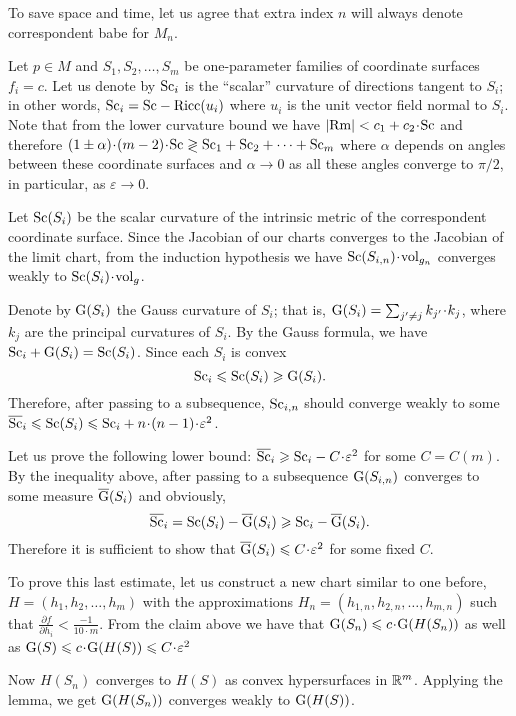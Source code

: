 \documentclass{article}
\begin{document}
To save space and time, let us agree that extra index
$n$ will always denote correspondent babe for $M_n$.

Let $p\in M$ and $S_1,S_2,\dots,S_m$ be one-parameter families of
 coordinate surfaces $f_i=c$.
Let us denote by $\mathrm{Sc}_i$ is the ``scalar'' curvature of directions tangent  to $S_i$; in other words, $\mathrm{Sc}_i=\mathrm{Sc}-\mathrm{Ricc}(u_i)$ where $u_i$ is the unit vector field normal to $S_i$.
Note that from the lower curvature bound we have $|\text{Rm}|<c_1+c_2\cdot \Sc$
and therefore $(1\pm\alpha)\cdot(m-2)\cdot \Sc\gtrless\Sc_1+\Sc_2+\dots+\Sc_m$
where $\alpha$ depends on angles between these coordinate
surfaces and $\alpha\to 0$
as all these angles converge to $\pi/2$, in particular, as $\varepsilon\to 0$.


Let $\mathrm{Sc}(S_i)$ be the scalar curvature of the intrinsic metric of the correspondent coordinate surface.
Since the Jacobian of our charts converges to the Jacobian of the limit chart, from the induction hypothesis we have $\Sc({S_{i,n}})\cdot \vol_{g_n}$
converges weakly to $\Sc(S_i)\cdot \vol_g$.

Denote by $\mathrm{G}(S_i)$ the Gauss curvature of $S_i$;
that is, $\G(S_i)\z=\sum_{j'\not=j}k_{j'}\cdot k_j$, where $k_j$ are the principal curvatures of $S_i$.
By the Gauss formula, we have $\mathrm{Sc}_i+\mathrm{G}(S_i)= \mathrm{Sc}(S_i)$.
Since each $S_i$ is convex
$$\mathrm{Sc}_i\leqslant \mathrm{Sc}(S_i)\geqslant \mathrm{G}(S_i).$$
Therefore, after passing to a subsequence,
$\mathrm{Sc}_{i,n}$ should converge weakly to some
$\overline{\Sc}_i\le \Sc(S_i)\le \Sc_i+n\cdot (n-1)\cdot \varepsilon^2$.

Let us prove the following lower bound: $\overline {\Sc}_i\ge  \Sc_i-C\cdot\varepsilon^2$ for some $C=C(m)$.
By the inequality above, after passing to a subsequence $\mathrm{G}(S_{i,n})$
 converges to some measure $\overline {\mathrm{G}}(S_i)$ and obviously,
\[\overline {\mathrm{Sc}}_i=\mathrm{Sc}(S_i)-\overline {\mathrm{G}}(S_i)\geqslant \mathrm{Sc}_i-\overline {\mathrm{G}}(S_i).\]
Therefore it is sufficient to show that $\overline \G(S_i)\le C\cdot\varepsilon^2$ for some fixed $C$.

To prove this last estimate, let us construct a new chart similar to
one before, $H=(h_1,h_2,\dots,h_m)$ with the approximations
$H_n=(h_{1,n},h_{2,n},\dots,h_{m,n})$ such that $\tfrac{\partial f}{\partial
h_i}<\tfrac{-1}{10\cdot m}$.
From the claim above we have that $\G(S_n)\le c
\cdot\G(H(S_n))$ as well as $\G(S)\le c\cdot \G(H(S))\le C\cdot\varepsilon^2$

Now $H(S_n)$ converges to $H(S)$ as convex hypersurfaces in $\mathbb{R}^m$.
Applying the lemma, we get $\mathrm{G}(H(S_n))$ converges weakly to $\mathrm{G}(H(S))$.
\end{document}
